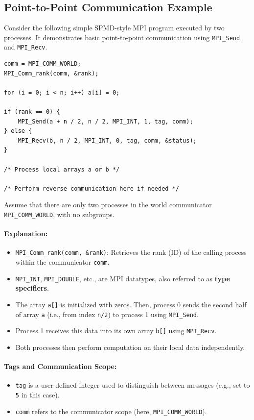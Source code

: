 \documentclass[12pt]{book}
\begin{document}
\subsection{Point-to-Point Communication Example}

Consider the following simple SPMD-style MPI program executed by two processes. It demonstrates basic point-to-point communication using \texttt{MPI\_Send} and \texttt{MPI\_Recv}.

\begin{lstlisting}[style=cppstyle, caption={Simple MPI Point-to-Point Example}, captionpos=b, label={lst:mpi-simple}]
comm = MPI_COMM_WORLD;
MPI_Comm_rank(comm, &rank);

for (i = 0; i < n; i++) a[i] = 0;

if (rank == 0) {
    MPI_Send(a + n / 2, n / 2, MPI_INT, 1, tag, comm);
} else {
    MPI_Recv(b, n / 2, MPI_INT, 0, tag, comm, &status);
}

/* Process local arrays a or b */

/* Perform reverse communication here if needed */
\end{lstlisting}

Assume that there are only two processes in the world communicator \texttt{MPI\_COMM\_WORLD}, with no subgroups.

\paragraph{Explanation:}
\begin{itemize}
    \item \texttt{MPI\_Comm\_rank(comm, \&rank)}: Retrieves the rank (ID) of the calling process within the communicator \texttt{comm}.
    \item \texttt{MPI\_INT}, \texttt{MPI\_DOUBLE}, etc., are MPI datatypes, also referred to as \textbf{type specifiers}.
    \item The array \texttt{a[]} is initialized with zeros. Then, process 0 sends the second half of array \texttt{a} (i.e., from index \texttt{n/2}) to process 1 using \texttt{MPI\_Send}.
    \item Process 1 receives this data into its own array \texttt{b[]} using \texttt{MPI\_Recv}.
    \item Both processes then perform computation on their local data independently.
\end{itemize}

\paragraph{Tags and Communication Scope:}
\begin{itemize}
    \item \texttt{tag} is a user-defined integer used to distinguish between messages (e.g., set to \texttt{5} in this case).
    \item \texttt{comm} refers to the communicator scope (here, \texttt{MPI\_COMM\_WORLD}).
\end{itemize}
\end{document}
